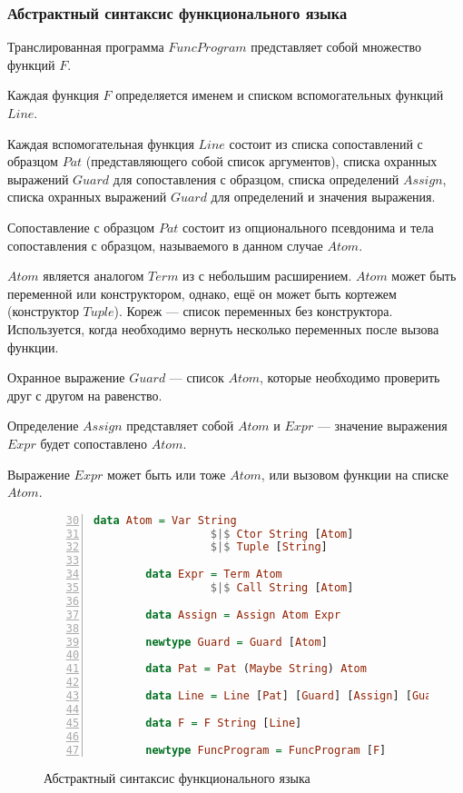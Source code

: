
\subsubsection{Абстрактный синтаксис функционального языка}

Транслированная программа $FuncProgram$ представляет собой множество функций $F$.

Каждая функция $F$ определяется именем и списком вспомогательных функций $Line$.

Каждая вспомогательная функция $Line$ состоит из списка сопоставлений с образцом $Pat$ (представляющего собой список аргументов), списка охранных выражений $Guard$ для сопоставления с образцом, списка определений $Assign$, списка охранных выражений $Guard$ для определений и значения выражения.

Сопоставление с образцом $Pat$ состоит из опционального псевдонима и тела сопоставления с образцом, называемого в данном случае $Atom$.

$Atom$ является аналогом $Term$ из \miniKanren{} с небольшим расширением.
$Atom$ может быть переменной или конструктором, однако, ещё он может быть кортежем (конструктор $Tuple$).
Кореж --- список переменных без конструктора.
Используется, когда необходимо вернуть несколько переменных после вызова функции.

Охранное выражение $Guard$ --- список $Atom$, которые необходимо проверить друг с другом на равенство.

Определение $Assign$ представляет собой $Atom$ и $Expr$ --- значение выражения $Expr$ будет сопоставлено $Atom$.

Выражение $Expr$ может быть или тоже $Atom$, или вызовом функции на списке $Atom$.

\begin{figure}[h!]
  \begin{center}
  \begin{minipage}{0.7\textwidth}
  \begin{lstlisting}[language=Haskell, frame=single, numbers=left,numberstyle=\small, firstnumber=30, escapechar=|]
        data Atom = Var String
                  $|$ Ctor String [Atom]
                  $|$ Tuple [String]
        
        data Expr = Term Atom
                  $|$ Call String [Atom]
        
        data Assign = Assign Atom Expr
        
        newtype Guard = Guard [Atom]
        
        data Pat = Pat (Maybe String) Atom
        
        data Line = Line [Pat] [Guard] [Assign] [Guard] Expr
        
        data F = F String [Line]
        
        newtype FuncProgram = FuncProgram [F]
    \end{lstlisting}
  \end{minipage}
  \end{center}
  \caption{Абстрактный синтаксис функционального языка}
  \label{lst:funcast}
\end{figure}
